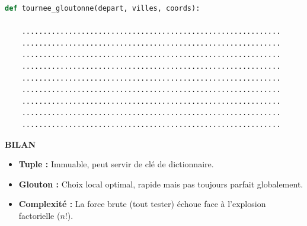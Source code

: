 \begin{Exercise}[title={Mission MayLivraison : Le défi du Drone }]
\begin{enumerate}
    \begin{lstlisting}[style=pythonstyle, language=Python]
def tournee_gloutonne(depart, villes, coords):

    .............................................................
    .............................................................
    .............................................................
    .............................................................
    .............................................................
    .............................................................
    .............................................................
    .............................................................
    .............................................................
    \end{lstlisting}
\end{enumerate}
\end{Exercise}




\begin{Comprendre}
 \textbf{BILAN}
\begin{itemize}
    \item \textbf{Tuple :} Immuable, peut servir de clé de dictionnaire.
    \item \textbf{Glouton :} Choix local optimal, rapide mais pas toujours parfait globalement.
    \item \textbf{Complexité :} La force brute (tout tester) échoue face à l'explosion factorielle ($n!$).
\end{itemize}
\end{Comprendre}